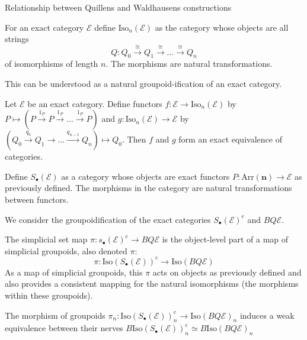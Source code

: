 \documentclass[10pt]{beamer}
\begin{document}
\begin{frame}{Relationship between Quillens and Waldhausens constructions}
	\begin{definition}
		For an exact category \( \mathcal{E} \) define $\mathrm{Iso}_n(\mathcal{E})$ as the category whose objects are all strings
		\[ Q \colon Q_0 \xrightarrow{\cong} Q_1 \xrightarrow{\cong} \dots \xrightarrow{\cong} Q_n \]
		of isomorphisms of length $n$. The morphisms are natural transformations.
	\end{definition}
	
	This can be understood as a natural groupoid-ification of an exact category.
	
	\begin{lemma}\label{lem:isoequivexact}
		Let $\mathcal{E}$ be an exact category. Define functors $f: \mathcal{E} \to \mathrm{Iso}_n(\mathcal{E})$ by $P \mapsto (P \xrightarrow{1_P} P \xrightarrow{1_P} \dots \xrightarrow{1_P} P)$ and $g: \mathrm{Iso}_n(\mathcal{E}) \to \mathcal{E}$ by $(Q_0 \xrightarrow{q_0} Q_1 \to \dots \xrightarrow{q_{n-1}} Q_n) \mapsto Q_0$. Then $f$ and $g$ form an exact equivalence of categories.
	\end{lemma}
	
		\begin{definition}
		Define \( S_\bullet(\mathcal{E}) \) as a category whose objects are exact functors \( P:\mathrm{Arr} (\mathbf{n}) \to \mathcal{E}\) as previously defined. The morphisms in the category are natural transformations between functors.
	\end{definition}
	
	
	We consider the groupoidification of the exact categories $S_\bullet(\mathcal{E})^e$ and $BQ\mathcal{E}$.
	
	The simplicial set map $\pi \colon s_\bullet(\mathcal{E})^e \to BQ\mathcal{E}$ is the object-level part of a map of simplicial groupoids, also denoted $\pi$:
	\[ \pi \colon \mathrm{Iso}(S_\bullet(\mathcal{E}))^e \to \mathrm{Iso}(BQ\mathcal{E}) \]
	As a map of simplicial groupoids, this $\pi$ acts on objects as previously defined and also provides a consistent mapping for the natural isomorphisms (the morphisms within these groupoids).
	
	\begin{lemma}\label{lem:isoSisoBQEeq}
		The morphism of groupoids \( \pi_n: \mathrm{Iso}(S_\bullet (\mathcal{E}))^e_n \to \mathrm{Iso}(BQ\mathcal{E})_n \) induces a weak equivalence between their nerves \( B\mathrm{Iso}(S_\bullet (\mathcal{E}))^e_n \simeq B\mathrm{Iso}(BQ\mathcal{E})_n \)
	\end{lemma}
	

\end{frame}
\end{document}
